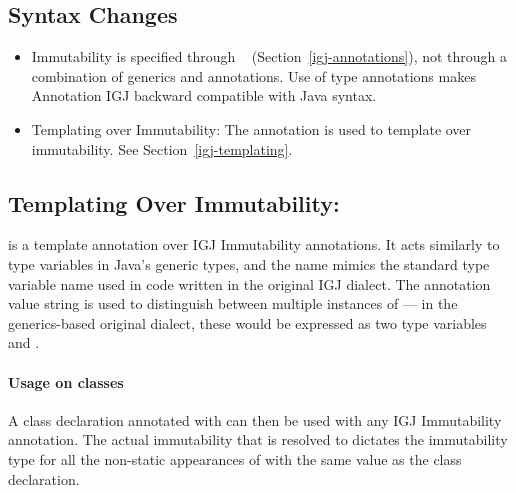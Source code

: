 \subsection{Syntax Changes}

\begin{itemize}

\item  Immutability is specified through
  ~\cite{JSR308-2008-09-12} (Section~\ref{igj-annotations}),
not through a combination of generics and annotations.  Use of type
annotations makes Annotation IGJ backward compatible with Java syntax.

\item Templating over Immutability: The annotation  is used to template
over immutability.  See Section~\ref{igj-templating}.

\end{itemize}


\subsection{Templating Over Immutability: \label{igj-templating}}

 is a template annotation over IGJ Immutability annotations. It acts
similarly to type variables in Java's generic types, and the name
 mimics the standard  type variable name used in code
written in the original IGJ dialect.  The annotation value string is used
to distinguish between multiple instances of  --- in the
generics-based original dialect, these would be expressed as two type
variables  and .

\paragraph{Usage on classes\label{igj-usage-on-classes}}

A class declaration annotated with  can then be
used with any IGJ Immutability annotation.  The actual immutability that
 is resolved to dictates the immutability type for all the non-static
appearances of  with the same value as the class declaration.

